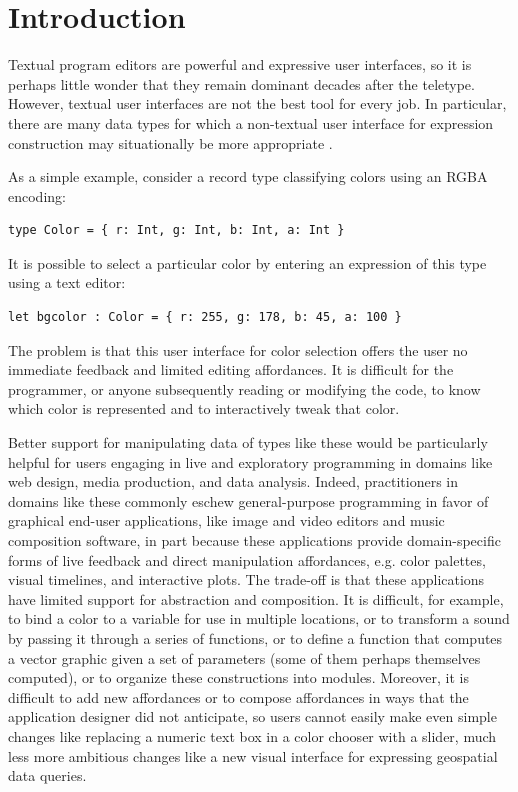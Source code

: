 \section{Introduction}\label{sec:intro}
Textual program editors are powerful and expressive user interfaces, 
so it is perhaps little wonder that they remain dominant decades after the teletype. 
However, textual user interfaces are not the best tool for every job. 
In particular, there are many 
data types for which a non-textual  
user interface for expression construction may situationally be more appropriate \cite{Graphite}.

As a simple example, consider a record type 
classifying colors using an RGBA encoding:
\begin{lstlisting}[numbers=none]
type Color = { r: Int, g: Int, b: Int, a: Int }
\end{lstlisting}
It is possible to select a particular color by entering  
an expression of this type using a text editor:
\begin{lstlisting}[numbers=none]
let bgcolor : Color = { r: 255, g: 178, b: 45, a: 100 }
\end{lstlisting}
The problem is that this user interface for color selection 
offers the user no immediate feedback 
and limited editing affordances.
It is difficult for the programmer, or anyone subsequently reading or modifying the code, to know which color is represented 
and to interactively tweak that color. 

Better support for manipulating data of types like these would be particularly helpful for users engaging in 
live and exploratory programming in domains like web design, media production, 
and data analysis. Indeed, practitioners in domains like these commonly eschew general-purpose programming 
in favor of graphical end-user applications, like %
image and video editors and music composition software, 
in part because these applications provide domain-specific forms of live feedback and 
direct manipulation affordances, e.g. color palettes, visual timelines, and interactive plots. 
The trade-off is that these applications have limited support for abstraction and composition. 
It is difficult, for example, to bind a
color to a variable for use in multiple locations, 
or to transform a sound by passing it through a series of functions, 
or to define a function that computes a vector graphic given a set
of parameters (some of them perhaps themselves computed), 
or to organize these constructions into modules.
Moreover, it is difficult to add new affordances or to compose 
affordances in ways that the application designer did not anticipate, 
so users cannot easily make even simple changes like replacing a numeric text box in a color chooser with a slider, 
much less more ambitious changes like a new visual interface for expressing geospatial data queries.

